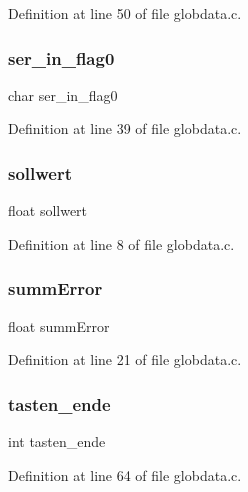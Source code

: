 Definition at line 50 of file globdata.\+c.

\mbox{\label{globdata_8c_ae833a459aae87f49988d4eaf9e4b77fb}} 
\subsubsection{ser\+\_\+in\+\_\+flag0}
{\footnotesize\ttfamily char ser\+\_\+in\+\_\+flag0}



Definition at line 39 of file globdata.\+c.

\mbox{\label{globdata_8c_a2c136600ad35ca7175a7587f3c418e04}} 
\subsubsection{sollwert}
{\footnotesize\ttfamily float sollwert}



Definition at line 8 of file globdata.\+c.

\mbox{\label{globdata_8c_a8193a517f72582ab169c0b615c301d86}} 
\subsubsection{summ\+Error}
{\footnotesize\ttfamily float summ\+Error}



Definition at line 21 of file globdata.\+c.

\mbox{\label{globdata_8c_aff6c80ed26dca833cec34c381bbce97d}} 
\subsubsection{tasten\+\_\+ende}
{\footnotesize\ttfamily int tasten\+\_\+ende}



Definition at line 64 of file globdata.\+c.

\mbox{\label{globdata_8c_a83000442396f36de5caccf11856a3548}} 

